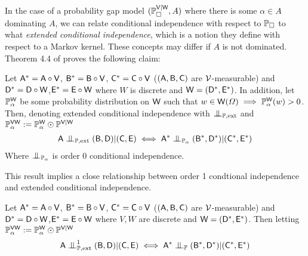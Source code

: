 In the case of a probability gap model $(\mathbb{P}_{\square}^{\mathsf{V}|\mathsf{W}},A)$ where there is some $\alpha\in A$ dominating $A$, we can relate conditional independence with respect to $\mathbb{P}_\square$ to what \citet{constantinou_extended_2017} \emph{extended conditional independence}, which is a notion they define with respect to a Markov kernel. These concepts may differ if $A$ is not dominated. Theorem 4.4 of \citet{constantinou_extended_2017} proves the following claim:

\begin{theorem}\label{th:dawid_constantionou}
Let $\mathsf{A}^*=\mathsf{A}\circ \mathsf{V}$, $\mathsf{B}^*=\mathsf{B}\circ\mathsf{V}$, $\mathsf{C}^*=\mathsf{C}\circ \mathsf{V}$ ($(\mathsf{A},\mathsf{B},\mathsf{C})$ are $\mathcal{V}$-measurable) and $\mathsf{D}^*=\mathsf{D}\circ \mathsf{W}$,$\mathsf{E}^*=\mathsf{E}\circ \mathsf{W}$ where $W$ is discrete and $\mathsf{W}=(\mathsf{D}^*,\mathsf{E}^*)$. In addition, let $\mathbb{P}_\alpha^{\mathsf{W}}$ be some probability distribution on $\mathsf{W}$ such that $w\in\mathsf{W}(\Omega)\implies \mathbb{P}_\alpha^{\mathsf{W}}(w)>0$. Then, denoting extended conditional independence with $\CI_{\prob{P},\text{ext}}$ and $\mathbb{P}_\alpha^{\mathsf{VW}}:=\mathbb{P}_\alpha^{\mathsf{W}}\odot \mathbb{P}^{\mathsf{V}|\mathsf{W}}$
\begin{align}
    \RV{A}\CI_{\prob{P},\text{ext}}(\RV{B},\RV{D})|(\RV{C},\RV{E})\iff \RV{A}^*\CI_{\prob{P}_\alpha}(\RV{B}^*,\RV{D}^*)|(\RV{C}^*,\RV{E}^*)
\end{align}
Where $\CI_{\prob{P}_\alpha}$ is order 0 conditional independence.
\end{theorem}

This result implies a close relationship between order 1 condtional independence and extended conditional independence.

\begin{theorem}
Let $\mathsf{A}^*=\mathsf{A}\circ \mathsf{V}$, $\mathsf{B}^*=\mathsf{B}\circ\mathsf{V}$, $\mathsf{C}^*=\mathsf{C}\circ \mathsf{V}$ ($(\mathsf{A},\mathsf{B},\mathsf{C})$ are $\mathcal{V}$-measurable) and $\mathsf{D}^*=\mathsf{D}\circ \mathsf{W}$,$\mathsf{E}^*=\mathsf{E}\circ \mathsf{W}$ where $V,W$ are discrete and $\mathsf{W}=(\mathsf{D}^*,\mathsf{E}^*)$. Then letting $\mathbb{P}_\alpha^{\mathsf{VW}}:=\mathbb{P}_\alpha^{\mathsf{W}}\odot \mathbb{P}^{\mathsf{V}|\mathsf{W}}$
\begin{align}
    \RV{A}\CI^1_{\prob{P},\text{ext}}(\RV{B},\RV{D})|(\RV{C},\RV{E})\iff \RV{A}^*\CI_{\prob{P}}(\RV{B}^*,\RV{D}^*)|(\RV{C}^*,\RV{E}^*)
\end{align}
\end{theorem}

